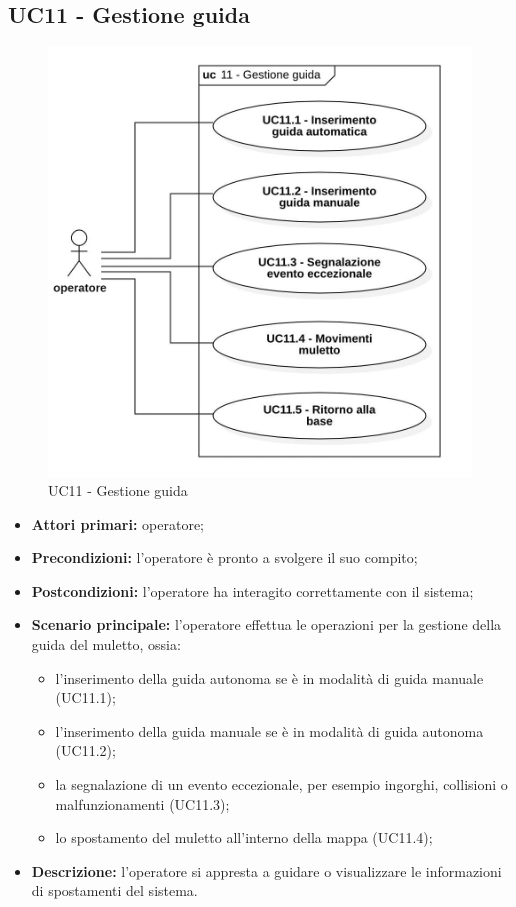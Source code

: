 \subsection{UC11 - Gestione guida}

\begin{figure}[H]
	\centering
	\includegraphics[scale=0.52]{res/images/uc11.png}
	\caption{ UC11 - Gestione guida}
\end{figure}

\begin{itemize}
	\item 	\textbf{Attori primari:} operatore;
	\item 	\textbf{Precondizioni:} l'operatore è pronto a svolgere il suo compito;
	\item 	\textbf{Postcondizioni:} l'operatore ha interagito correttamente con il sistema; 
	\item 	\textbf{Scenario principale:} l'operatore effettua le operazioni per la gestione della guida del muletto, ossia:
	\begin{itemize}
		\item l'inserimento della guida autonoma se è in modalità di guida manuale (UC11.1);
		\item l'inserimento della guida manuale se è in modalità di guida autonoma (UC11.2);
		\item la segnalazione di un evento eccezionale, per esempio ingorghi, collisioni o malfunzionamenti (UC11.3);
		\item lo spostamento del muletto all'interno della mappa (UC11.4);
	\end{itemize}
	\item 	\textbf{Descrizione:} l'operatore si appresta a guidare o visualizzare le informazioni di spostamenti del sistema. 

\end{itemize}

